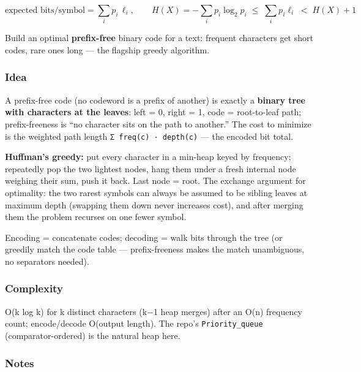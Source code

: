 \documentclass[
  10pt,
  letterpaper,
  onecolumn]{article}
\begin{document}
\begin{equation*}
\text{expected bits/symbol}=\sum_{i} p_i\,\ell_i,
\qquad
H(X)=-\sum_i p_i\log_2 p_i \;\le\; \sum_i p_i\ell_i \;<\; H(X)+1
\end{equation*}

Build an optimal \textbf{prefix-free} binary code for a text: frequent
characters get short codes, rare ones long --- the flagship greedy
algorithm.

\hypertarget{idea-6}{%
\subsubsection{Idea}\label{idea-6}}

A prefix-free code (no codeword is a prefix of another) is exactly a
\textbf{binary tree with characters at the leaves}: left = 0, right = 1,
code = root-to-leaf path; prefix-freeness is ``no character sits on the
path to another.'' The cost to minimize is the weighted path length
\texttt{Σ\ freq(c)\ ·\ depth(c)} --- the encoded bit total.

\textbf{Huffman's greedy:} put every character in a min-heap keyed by
frequency; repeatedly pop the two lightest nodes, hang them under a
fresh internal node weighing their sum, push it back. Last node = root.
The exchange argument for optimality: the two rarest symbols can always
be assumed to be sibling leaves at maximum depth (swapping them down
never increases cost), and after merging them the problem recurses on
one fewer symbol.

Encoding = concatenate codes; decoding = walk bits through the tree (or
greedily match the code table --- prefix-freeness makes the match
unambiguous, no separators needed).

\hypertarget{complexity-6}{%
\subsubsection{Complexity}\label{complexity-6}}

O(k log k) for k distinct characters (k−1 heap merges) after an O(n)
frequency count; encode/decode O(output length). The repo's
\texttt{Priority\_queue} (comparator-ordered) is the natural heap here.

\hypertarget{notes-5}{%
\subsubsection{Notes}\label{notes-5}}
\end{document}
